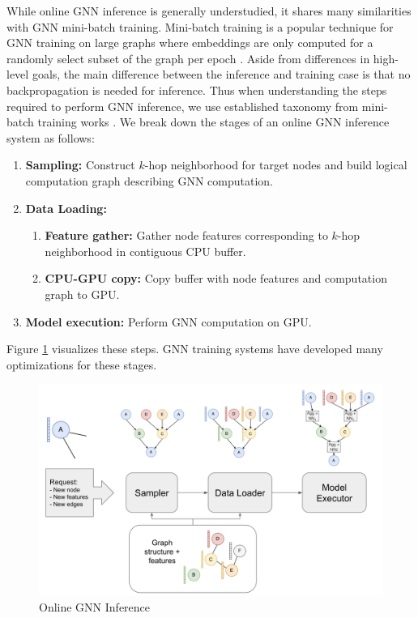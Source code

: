 While online GNN inference is generally understudied, it shares many similarities with GNN mini-batch training. 
Mini-batch training is a popular technique for GNN training on large graphs where embeddings are only computed for a randomly select subset of the graph per epoch \cite{BGL_2023}. 
Aside from differences in high-level goals, the main difference between the inference and training case is that no backpropagation is needed for inference. Thus when understanding the steps required to perform GNN inference, we use established taxonomy from mini-batch training works \cite{PaGraph_2020}\cite{GNNLab_2022}\cite{P3_2021}. We break down the stages of an online GNN inference system as follows:
\begin{enumerate}
    \item \textbf{Sampling:} Construct $k$-hop neighborhood for target nodes and build logical computation graph describing GNN computation.
    \item \textbf{Data Loading:}
    \begin{enumerate}
        \item \textbf{Feature gather:} Gather node features corresponding to $k$-hop neighborhood in contiguous CPU buffer.
        \item \textbf{CPU-GPU copy:} Copy buffer with node features and computation graph to GPU.
    \end{enumerate}
    \item \textbf{Model execution:} Perform GNN computation on GPU.
\end{enumerate}

Figure \ref{Compute Visualization} visualizes these steps. GNN training systems have developed many optimizations for these stages.

\begin{figure}[h!!!]
    \centering
    \includegraphics[width=\textwidth]{figures/Compute example.png}
    
    \caption{Online GNN Inference}
    \label{Compute Visualization}
\end{figure}    


